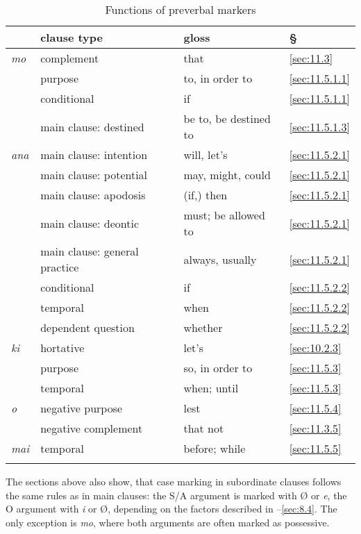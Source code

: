 \begin{table}
\begin{tabularx}{\textwidth}{L{8mm}L{50mm}L{36mm}L{12mm}}
\lsptoprule
& {clause type} & {gloss} & {§}\\
\midrule
\textit{mo} & complement & that & \ref{sec:11.3}\\
& purpose & to, in order to & \ref{sec:11.5.1.1}\\
& conditional & if & \ref{sec:11.5.1.1}\\
& main clause: destined & be to, be destined to & \ref{sec:11.5.1.3}\\
\tablevspace
\textit{ana} & main clause: intention & will, let’s & \ref{sec:11.5.2.1}\\
& main clause: potential & may, might, could & \ref{sec:11.5.2.1}\\
& main clause: apodosis & (if,) then & \ref{sec:11.5.2.1}\\
& main clause: deontic & must; be allowed to & \ref{sec:11.5.2.1}\\
& main clause: general practice & always, usually & \ref{sec:11.5.2.1}\\
& conditional & if & \ref{sec:11.5.2.2}\\
& temporal & when & \ref{sec:11.5.2.2}\\
& dependent question & whether & \ref{sec:11.5.2.2}\\
\tablevspace
\textit{ki} & hortative & let’s & \ref{sec:10.2.3}\\
& purpose & so, in order to & \ref{sec:11.5.3}\\
& temporal & when; until & \ref{sec:11.5.3}\\
\tablevspace
{\textit{{\ꞌ}o}} & negative purpose & lest & \ref{sec:11.5.4}\\
& negative complement & that not & \ref{sec:11.3.5}\\
\tablevspace
{\textit{mai}} & temporal & before; while & \ref{sec:11.5.5}\\
\lspbottomrule
\end{tabularx}
\caption{Functions of preverbal markers}
\label{tab:67}
\end{table}

The sections above also show, that case marking in subordinate clauses follows the same rules as in main clauses: the S/A argument is marked with Ø or \textit{e}, the O argument with \textit{i} or Ø, depending on the factors described in –\ref{sec:8.4}. The only exception is \textit{mo}, where both arguments are often marked as possessive.

